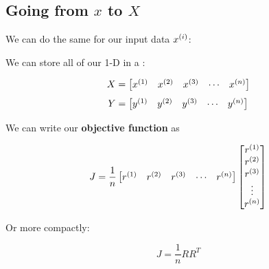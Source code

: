     \subsection{Going from $x$ to $X$}
    
        We can do the same for our input data $x^{(i)}$:\\
        
        \begin{notation}
            We can store all of our 1-D  in a :
            
            \begin{equation*}
                X =
                \begin{bmatrix}
                  x^{(1)} & x^{(2)} & x^{(3)} & \cdots & x^{(n)}
                \end{bmatrix}
            \end{equation*}
            \begin{equation*}
                Y =
                \begin{bmatrix}
                  y^{(1)} & y^{(2)} & y^{(3)} & \cdots & y^{(n)}
                \end{bmatrix}
            \end{equation*}
        \end{notation}
        
        We can write our \textbf{objective function} as
        
        \begin{equation}
            J = 
            \frac{1}{n}
            \begin{bmatrix}
              r^{(1)} & r^{(2)} & r^{(3)} & \cdots & r^{(n)}
            \end{bmatrix}
            \begin{bmatrix}
              r^{(1)} \\ r^{(2)} \\ r^{(3)} \\ \vdots \\ r^{(n)}
            \end{bmatrix}
        \end{equation}
        
        Or more compactly:
        
        \begin{equation}
            J = \frac{1}{n} RR^T
        \end{equation}

